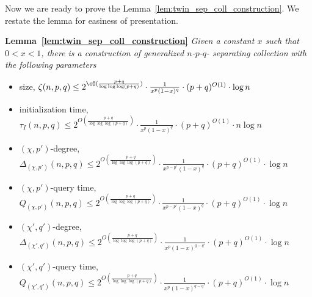 Now we are ready to prove the Lemma~\ref{lem:twin_sep_coll_construction}. We restate the lemma for easiness of presentation. 

\medskip 



{{\bf Lemma~\ref{lem:twin_sep_coll_construction}} \em 
Given a constant $x$ such that $0<x<1$, there is a construction of generalized $n$-$p$-$q$- separating collection with the following parameters
\begin{itemize} \item size, $\zeta(n,p,q) \leq 2^{\cO(\frac{p+q}{\log\log\log(p+q)})}\cdot \frac{1}{x^p(1-x)^q}\cdot (p+q)^{O(1)} \cdot \log n$
\item initialization time, $\tau_I(n,p,q) \leq  2^{O(\frac{p+q}{\log\log\log(p+q)})}\cdot \frac{1}{x^p(1-x)^q}\cdot (p+q)^{O(1)} \cdot n\log n$
\item $(\chi,p')$-degree, $\Delta_{(\chi,p')}(n,p,q) \leq  2^{O(\frac{p+q}{\log\log\log(p+q)})}\cdot \frac{1}{x^{p-p'}(1-x)^q}\cdot (p+q)^{O(1)} \cdot \log n$
\item $(\chi,p')$-query time, $Q_{(\chi,p')}(n,p,q) \leq  2^{O(\frac{p+q}{\log\log\log(p+q)})}\cdot \frac{1}{x^{p-p'}(1-x)^q}\cdot (p+q)^{O(1)} \cdot \log n$
\item $(\chi',q')$-degree, $\Delta_{(\chi',q')}(n,p,q) \leq  2^{O(\frac{p+q}{\log\log\log(p+q)})}\cdot \frac{1}{x^{p}(1-x)^{q-q'}}\cdot (p+q)^{O(1)} \cdot \log n$
\item $(\chi',q')$-query time, $Q_{(\chi',q')}(n,p,q) \leq  2^{O(\frac{p+q}{\log\log\log(p+q)})}\cdot \frac{1}{x^{p}(1-x)^{q-q'}}\cdot (p+q)^{O(1)} \cdot \log n$
\end{itemize}}





